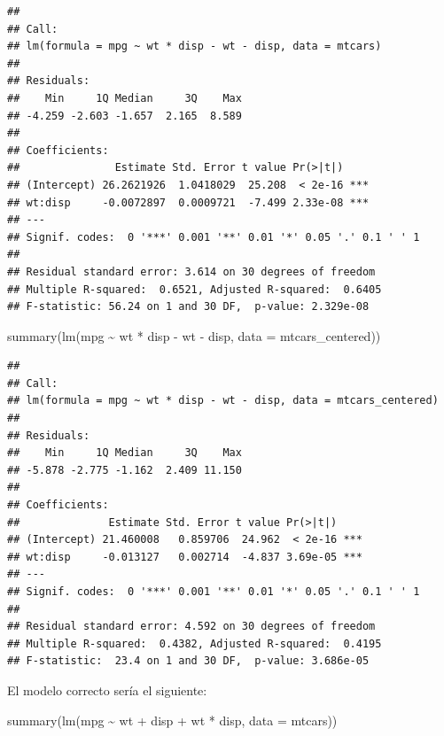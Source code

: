 \documentclass[
  12pt,
]{book}
\newenvironment{Shaded}{\begin{snugshade}}{\end{snugshade}}
\newcommand{\AttributeTok}[1]{\textcolor[rgb]{0.77,0.63,0.00}{#1}}
\newcommand{\FunctionTok}[1]{\textcolor[rgb]{0.00,0.00,0.00}{#1}}
\newcommand{\NormalTok}[1]{#1}
\newcommand{\SpecialCharTok}[1]{\textcolor[rgb]{0.00,0.00,0.00}{#1}}
\theoremstyle{definition}
\theoremstyle{definition}
\theoremstyle{definition}
\theoremstyle{definition}
\theoremstyle{remark}
\begin{document}
\begin{verbatim}
## 
## Call:
## lm(formula = mpg ~ wt * disp - wt - disp, data = mtcars)
## 
## Residuals:
##    Min     1Q Median     3Q    Max 
## -4.259 -2.603 -1.657  2.165  8.589 
## 
## Coefficients:
##               Estimate Std. Error t value Pr(>|t|)    
## (Intercept) 26.2621926  1.0418029  25.208  < 2e-16 ***
## wt:disp     -0.0072897  0.0009721  -7.499 2.33e-08 ***
## ---
## Signif. codes:  0 '***' 0.001 '**' 0.01 '*' 0.05 '.' 0.1 ' ' 1
## 
## Residual standard error: 3.614 on 30 degrees of freedom
## Multiple R-squared:  0.6521, Adjusted R-squared:  0.6405 
## F-statistic: 56.24 on 1 and 30 DF,  p-value: 2.329e-08
\end{verbatim}

\begin{Shaded}
\begin{Highlighting}[]
\FunctionTok{summary}\NormalTok{(}\FunctionTok{lm}\NormalTok{(mpg }\SpecialCharTok{\textasciitilde{}}\NormalTok{ wt }\SpecialCharTok{*}\NormalTok{ disp }\SpecialCharTok{{-}}\NormalTok{ wt }\SpecialCharTok{{-}}\NormalTok{ disp, }\AttributeTok{data =}\NormalTok{ mtcars\_centered))}
\end{Highlighting}
\end{Shaded}

\begin{verbatim}
## 
## Call:
## lm(formula = mpg ~ wt * disp - wt - disp, data = mtcars_centered)
## 
## Residuals:
##    Min     1Q Median     3Q    Max 
## -5.878 -2.775 -1.162  2.409 11.150 
## 
## Coefficients:
##              Estimate Std. Error t value Pr(>|t|)    
## (Intercept) 21.460008   0.859706  24.962  < 2e-16 ***
## wt:disp     -0.013127   0.002714  -4.837 3.69e-05 ***
## ---
## Signif. codes:  0 '***' 0.001 '**' 0.01 '*' 0.05 '.' 0.1 ' ' 1
## 
## Residual standard error: 4.592 on 30 degrees of freedom
## Multiple R-squared:  0.4382, Adjusted R-squared:  0.4195 
## F-statistic:  23.4 on 1 and 30 DF,  p-value: 3.686e-05
\end{verbatim}

El modelo correcto sería el siguiente:

\begin{Shaded}
\begin{Highlighting}[]
\FunctionTok{summary}\NormalTok{(}\FunctionTok{lm}\NormalTok{(mpg }\SpecialCharTok{\textasciitilde{}}\NormalTok{ wt }\SpecialCharTok{+}\NormalTok{ disp }\SpecialCharTok{+}\NormalTok{ wt }\SpecialCharTok{*}\NormalTok{ disp, }\AttributeTok{data =}\NormalTok{ mtcars))}
\end{Highlighting}
\end{Shaded}
\end{document}
